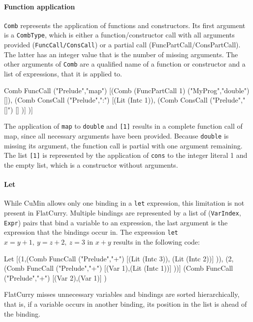 \documentclass[fleqn, abstract=on]{scrreprt}
\newcommand{\coqinline}[1]{\texttt{#1}}
\begin{document}
\paragraph{Function application}
\coqinline{Comb} represents the application of functions and constructors. Its first argument is a \coqinline{CombType}, which is either a function/constructor call with all arguments provided (\coqinline{FuncCall/ConsCall}) or a partial call (FuncPartCall/ConsPartCall). The latter has an integer value that is the number of missing arguments. The other arguments of \coqinline{Comb} are a qualified name of a function or constructor and a list of expressions, that it is applied to.
\begin{coqcode}
Comb FuncCall ("Prelude","map") 
     [(Comb (FuncPartCall 1) ("MyProg","double") []),
      (Comb ConsCall ("Prelude",":") [(Lit (Intc 1)),
                                      (Comb ConsCall ("Prelude","[]") [] )] )]
\end{coqcode}
The application of \texttt{map} to \texttt{double} and \texttt{[1]} results in a complete function call of map, since all necessary arguments have been provided. Because \texttt{double} is missing its argument, the function call is partial with one argument remaining. The list \texttt{[1]} is represented by the application of \texttt{cons} to the integer literal 1 and the empty list, which is a constructor without arguments.
\paragraph{Let}
While CuMin allows only one binding in a \texttt{let} expression, this limitation is not present in FlatCurry. Multiple bindings are represented by a list of (\coqinline{VarIndex}, \coqinline{Expr}) pairs that bind a variable to an expression, the last argument is the expression that the bindings occur in. The expression \texttt{let} $x = y + 1,\: y = z + 2,\: z = 3$ in $x + y$ results in the following code:
\begin{coqcode}
Let [(1,(Comb FuncCall ("Prelude","+") [(Lit (Intc 3)), (Lit (Intc 2))] )),
     (2,(Comb FuncCall ("Prelude","+") [(Var 1),(Lit (Intc 1))] ))]
    (Comb FuncCall ("Prelude","+") [(Var 2),(Var 1)] )
\end{coqcode}
FlatCurry misses unnecessary variables and bindings are sorted hierarchically, that is, if a variable occurs in another binding, its position in the list is ahead of the binding.
\end{document}

